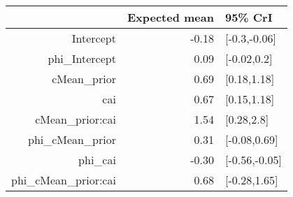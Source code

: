 \begin{tabular}{rrl}
  \hline
 & Expected mean & 95\% CrI \\ 
  \hline
Intercept & -0.18 & [-0.3,-0.06] \\ 
  phi\_Intercept & 0.09 & [-0.02,0.2] \\ 
  cMean\_prior & 0.69 & [0.18,1.18] \\ 
  cai & 0.67 & [0.15,1.18] \\ 
  cMean\_prior:cai & 1.54 & [0.28,2.8] \\ 
  phi\_cMean\_prior & 0.31 & [-0.08,0.69] \\ 
  phi\_cai & -0.30 & [-0.56,-0.05] \\ 
  phi\_cMean\_prior:cai & 0.68 & [-0.28,1.65] \\ 
   \hline
\end{tabular}


